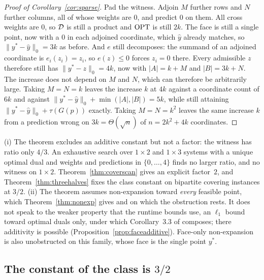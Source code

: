 \begin{proof}[Proof of Corollary~\ref{cor:sparse}]
Pad the witness. Adjoin $M$ further rows and $N$ further columns, all of whose weights are $0$,
and predict $0$ on them. All cross weights are $0$, so $\mathcal{D}$ is still a product and $\mathrm{OPT}$ is
still $2k$. The face is still a single point, now with a $0$ in each adjoined coordinate, which
$\hat y$ already matches, so $\|y^* - \hat y\|_0 = 3k$ as before. And $e$ still decomposes: the
summand of an adjoined coordinate is $e_i(z_i) = z_i$, so $e(z) \le 0$ forces $z_i = 0$ there.
Every admissible $z$ therefore still has $\|y^* - z\|_0 = 4k$, now with $|A| = k + M$ and
$|B| = 3k + N$. The increase does not depend on $M$ and $N$, which can therefore be arbitrarily large.
Taking $M = N = k$ leaves the increase $k$ at $4k$ against a coordinate count of $6k$ and against
$\|y^* - \hat y\|_0 + \min(|A|,|B|) = 5k$, while still attaining $\|y^* - \hat y\|_0 + \tau(G(p))$
exactly. Taking $M = N = k^2$ leaves the same increase $k$ from a prediction wrong on
$3k = \Theta(\sqrt{n})$ of $n = 2k^2 + 4k$ coordinates.
\end{proof}

\begin{remark}\label{rem:noadditivescope}
(i) The theorem excludes an additive constant but not a factor: the witness has ratio only $4/3$.
An exhaustive search over $1 \times 2$ and $1 \times 3$ systems with a unique optimal dual and
weights and predictions in $\{0, \dots, 4\}$ finds no larger ratio, and no witness on
$1 \times 2$. Theorem~\ref{thm:coverscan} gives an explicit factor~$2$, and
Theorem~\ref{thm:threehalves} fixes the class constant on bipartite covering instances at $3/2$.
(ii) The theorem assumes non-expansion toward \emph{every} feasible point, which
Theorem~\ref{thm:nonexp} gives and on which the obstruction rests. It does not speak to the weaker
property that the runtime bounds use, an $\ell_1$ bound toward optimal duals only, under which
Corollary~3.3 of \citet{chen2022} composes;
there additivity is possible (Proposition~\ref{prop:faceadditive}). Face-only non-expansion is
also unobstructed on this family, whose face is the single point $y^*$.
\end{remark}

\subsection{The constant of the class is \texorpdfstring{$3/2$}{3/2}}

